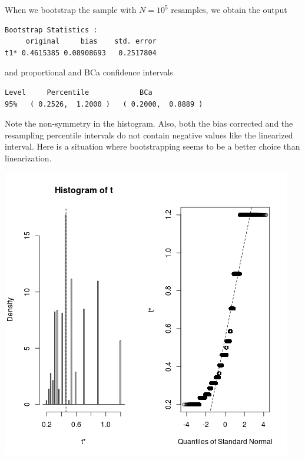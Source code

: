 \documentclass{homework}
\begin{document}
\begin{solution}
\begin{minipage}{.5\textwidth}
When we bootstrap the sample with $N=10^5$ resamples, we obtain the output
{\footnotesize
\begin{verbatim}
Bootstrap Statistics :
     original     bias    std. error
t1* 0.4615385 0.08908693   0.2517804
\end{verbatim}
}
and proportional and BCa confidence intervals
{\footnotesize
\begin{verbatim}
Level     Percentile            BCa          
95%   ( 0.2526,  1.2000 )   ( 0.2000,  0.8889 )  
\end{verbatim}
}
Note the non-symmetry in the histogram. Also, both the bias corrected and the resampling percentile intervals do not contain negative values like the linearized interval.  Here is a situation where bootstrapping seems to be a better choice than linearization.

\end{minipage}
\begin{minipage}{.48\textwidth}
\includegraphics[width=\textwidth]{mean_lake_bootstraps.png}
\end{minipage}

\end{solution}
\newpage 
\end{document}
